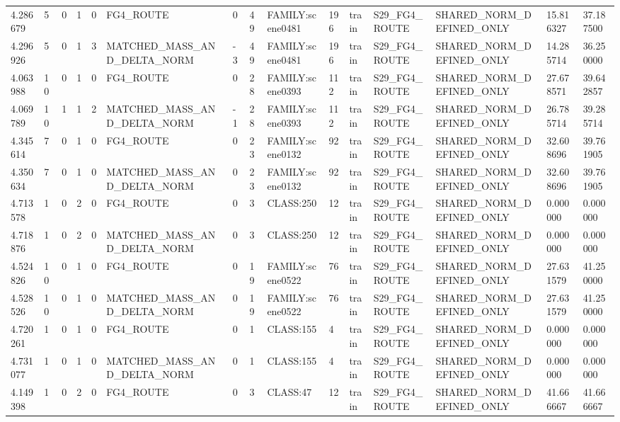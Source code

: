 \begin{tabular}{lllllllllllllll}
4.286679 & 5 & 0 & 1 & 0 & FG4\_ROUTE & 0 & 49 & FAMILY:scene0481 & 196 & train & S29\_FG4\_ROUTE & SHARED\_NORM\_DEFINED\_ONLY & 15.816327 & 37.187500 \\
4.296926 & 5 & 0 & 1 & 3 & MATCHED\_MASS\_AND\_DELTA\_NORM & -3 & 49 & FAMILY:scene0481 & 196 & train & S29\_FG4\_ROUTE & SHARED\_NORM\_DEFINED\_ONLY & 14.285714 & 36.250000 \\
4.063988 & 10 & 0 & 1 & 0 & FG4\_ROUTE & 0 & 28 & FAMILY:scene0393 & 112 & train & S29\_FG4\_ROUTE & SHARED\_NORM\_DEFINED\_ONLY & 27.678571 & 39.642857 \\
4.069789 & 10 & 1 & 1 & 2 & MATCHED\_MASS\_AND\_DELTA\_NORM & -1 & 28 & FAMILY:scene0393 & 112 & train & S29\_FG4\_ROUTE & SHARED\_NORM\_DEFINED\_ONLY & 26.785714 & 39.285714 \\
4.345614 & 7 & 0 & 1 & 0 & FG4\_ROUTE & 0 & 23 & FAMILY:scene0132 & 92 & train & S29\_FG4\_ROUTE & SHARED\_NORM\_DEFINED\_ONLY & 32.608696 & 39.761905 \\
4.350634 & 7 & 0 & 1 & 0 & MATCHED\_MASS\_AND\_DELTA\_NORM & 0 & 23 & FAMILY:scene0132 & 92 & train & S29\_FG4\_ROUTE & SHARED\_NORM\_DEFINED\_ONLY & 32.608696 & 39.761905 \\
4.713578 & 1 & 0 & 2 & 0 & FG4\_ROUTE & 0 & 3 & CLASS:250 & 12 & train & S29\_FG4\_ROUTE & SHARED\_NORM\_DEFINED\_ONLY & 0.000000 & 0.000000 \\
4.718876 & 1 & 0 & 2 & 0 & MATCHED\_MASS\_AND\_DELTA\_NORM & 0 & 3 & CLASS:250 & 12 & train & S29\_FG4\_ROUTE & SHARED\_NORM\_DEFINED\_ONLY & 0.000000 & 0.000000 \\
4.524826 & 10 & 0 & 1 & 0 & FG4\_ROUTE & 0 & 19 & FAMILY:scene0522 & 76 & train & S29\_FG4\_ROUTE & SHARED\_NORM\_DEFINED\_ONLY & 27.631579 & 41.250000 \\
4.528526 & 10 & 0 & 1 & 0 & MATCHED\_MASS\_AND\_DELTA\_NORM & 0 & 19 & FAMILY:scene0522 & 76 & train & S29\_FG4\_ROUTE & SHARED\_NORM\_DEFINED\_ONLY & 27.631579 & 41.250000 \\
4.720261 & 1 & 0 & 1 & 0 & FG4\_ROUTE & 0 & 1 & CLASS:155 & 4 & train & S29\_FG4\_ROUTE & SHARED\_NORM\_DEFINED\_ONLY & 0.000000 & 0.000000 \\
4.731077 & 1 & 0 & 1 & 0 & MATCHED\_MASS\_AND\_DELTA\_NORM & 0 & 1 & CLASS:155 & 4 & train & S29\_FG4\_ROUTE & SHARED\_NORM\_DEFINED\_ONLY & 0.000000 & 0.000000 \\
4.149398 & 1 & 0 & 2 & 0 & FG4\_ROUTE & 0 & 3 & CLASS:47 & 12 & train & S29\_FG4\_ROUTE & SHARED\_NORM\_DEFINED\_ONLY & 41.666667 & 41.666667 \\

\end{tabular}
